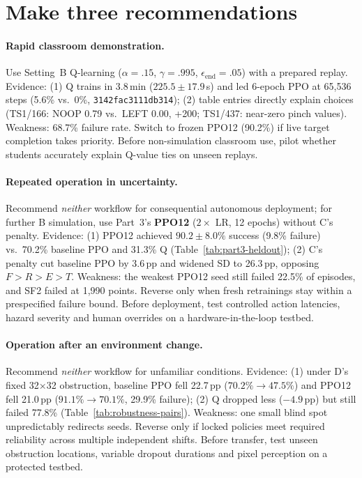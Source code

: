 \setcounter{section}{5}
\section{Make three recommendations}
\label{sec:recommendations}

\paragraph{Rapid classroom demonstration.}
Use Setting~B Q-learning ($\alpha=.15$, $\gamma=.995$, $\epsilon_{\mathrm{end}}=.05$) with a
prepared replay. Evidence: (1) Q trains in 3.8\,min ($225.5\pm 17.9$\,s) and led 6-epoch PPO at
65,536 steps (5.6\% vs.\ 0\%, \texttt{3142fac3111db314}); (2) table entries directly explain
choices (TS1/166: NOOP 0.79 vs.\ LEFT 0.00, +200; TS1/437: near-zero pinch values). Weakness:
68.7\% failure rate. Switch to frozen PPO12 (90.2\%) if live target completion takes priority.
Before non-simulation classroom use, pilot whether students accurately explain Q-value ties on
unseen replays.

\paragraph{Repeated operation in uncertainty.}
Recommend \emph{neither} workflow for consequential autonomous deployment; for further B
simulation, use Part~3's \textbf{PPO12} ($2\times$ LR, 12 epochs) without C's penalty. Evidence:
(1) PPO12 achieved $90.2\pm 8.0\%$ success (9.8\% failure) vs.\ 70.2\% baseline PPO and 31.3\% Q
(Table~\ref{tab:part3-heldout}); (2) C's penalty cut baseline PPO by 3.6\,pp and widened SD to
26.3\,pp, opposing $F>R>E>T$. Weakness: the weakest PPO12 seed still failed 22.5\% of episodes,
and SF2 failed at 1,990 points. Reverse only when fresh retrainings stay within a prespecified
failure bound. Before deployment, test controlled action latencies, hazard severity and human
overrides on a hardware-in-the-loop testbed.

\paragraph{Operation after an environment change.}
Recommend \emph{neither} workflow for unfamiliar conditions. Evidence: (1) under D's fixed
32$\times$32 obstruction, baseline PPO fell 22.7\,pp ($70.2\%\to 47.5\%$) and PPO12 fell 21.0\,pp
($91.1\%\to 70.1\%$, 29.9\% failure); (2) Q dropped less ($-4.9$\,pp) but still failed 77.8\%
(Table~\ref{tab:robustness-pairs}). Weakness: one small blind spot unpredictably redirects seeds.
Reverse only if locked policies meet required reliability across multiple independent shifts.
Before transfer, test unseen obstruction locations, variable dropout durations and pixel
perception on a protected testbed.

